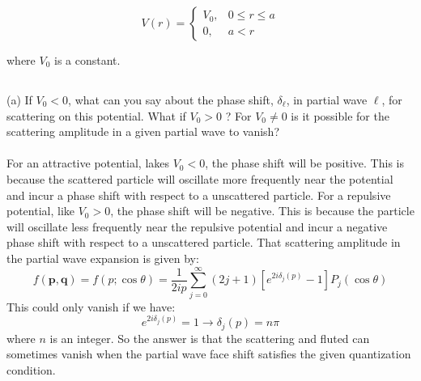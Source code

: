 \documentclass[12pt]{article}
\begin{document}
\[
V(r)= \begin{cases}V_{0}, & 0 \leq r \leq a  \tag{7}\\ 0, & a<r\end{cases}
\]

where $V_{0}$ is a constant.
\subsection{}
(a) If $V_{0}<0$, what can you say about the phase shift, $\delta_{\ell}$, in partial wave $\ell$, for scattering on this potential. What if $V_{0}>0$ ? For $V_{0} \neq 0$ is it possible for the scattering amplitude in a given partial wave to vanish?\\\\
For an attractive potential, lakes $V_{0}<0$, the phase shift will be positive. This is because the scattered particle will oscillate more frequently near the potential and incur a phase shift with respect to a unscattered particle. For a repulsive potential, like $V_{0}>0$, the phase shift will be negative. This is because the particle will oscillate less frequently near the repulsive potential and incur a negative phase shift with respect to a unscattered particle. That scattering amplitude in the partial wave expansion is given by:
\begin{equation}
f(\mathbf{p}, \mathbf{q})=f(p ; \cos \theta)=\frac{1}{2 i p} \sum_{j=0}^{\infty}(2 j+1)\left[e^{2 i \delta_j(p)}-1\right] P_j(\cos \theta)
\end{equation}
This could only vanish if we have:
\begin{equation}
e^{2 i \delta_j(p)}=1 \rightarrow \delta_j(p)=n\pi
\end{equation}
where $n$ is an integer. So the answer is that the scattering and fluted can sometimes vanish when the partial wave face shift satisfies the given quantization condition.
\end{document}
